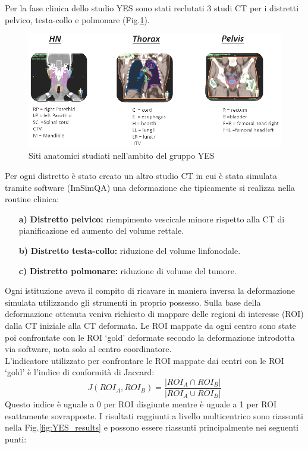 Per la fase clinica dello studio YES sono stati reclutati 3 studi CT per i distretti pelvico, testa-collo e polmonare (Fig.\ref{fig:YES_sites}).
\begin{figure}
\centering
\includegraphics[width=\textwidth]{./cap3/YES_Sites.png}
\caption{Siti anatomici studiati nell'ambito del gruppo YES}
\label{fig:YES_sites}
\end{figure}
Per ogni distretto è stato creato un altro studio CT in cui è stata simulata tramite software (ImSimQA) una deformazione che tipicamente si realizza nella routine clinica:
\begin{itemize}
\item[\textbf{a)}] \textbf{Distretto pelvico:} riempimento vescicale minore rispetto alla CT di pianificazione ed aumento del volume rettale.
\item[\textbf{b)}] \textbf{Distretto testa-collo:} riduzione del volume linfonodale.
\item[\textbf{c)}] \textbf{Distretto polmonare:} riduzione di volume del tumore.
\end{itemize}
Ogni istituzione aveva il compito di ricavare in maniera inversa la deformazione simulata utilizzando gli strumenti in proprio possesso. Sulla base della deformazione ottenuta veniva richiesto di mappare delle regioni di interesse (ROI) dalla CT iniziale alla CT deformata. Le ROI mappate da ogni centro sono state poi confrontate con le ROI `gold' deformate secondo la deformazione introdotta via software, nota solo al centro coordinatore.\\
L'indicatore utilizzato per confrontare le ROI mappate dai centri con le ROI `gold' è l'indice di conformità di Jaccard:
\begin{equation}
J(ROI_{A},ROI_{B}) = \frac{|ROI_{A} \cap ROI_{B}|}{|ROI_{A} \cup ROI_{B}|}
\end{equation}
Questo indice è uguale a 0 per ROI disgiunte mentre è uguale a 1 per ROI esattamente sovrapposte.
I risultati raggiunti a livello multicentrico sono riassunti nella Fig.\ref{fig:YES_results} e possono essere riassunti principalmente nei seguenti punti:
